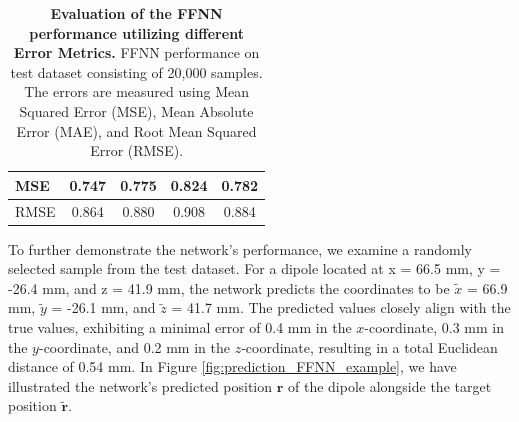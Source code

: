 \documentclass[a4paper, UKenglish, 11pt]{uiomaster}
\begin{document}
\begin{table}[!htb]
\begin{tabular}{l|cccc|}
\multicolumn{1}{|l|}{\cellcolor[HTML]{EFEFEF}MSE}  & \multicolumn{1}{c|}{0.747}                                                                                  & \multicolumn{1}{c|}{0.775}                                                                                   & \multicolumn{1}{c|}{0.824}                                                                                   & 0.782                                                                                                              \\ \hline
\multicolumn{1}{|l|}{\cellcolor[HTML]{EFEFEF}RMSE} & \multicolumn{1}{c|}{0.864}                                                                                  & \multicolumn{1}{c|}{0.880}                                                                                   & \multicolumn{1}{c|}{0.908}                                                                                   & 0.884                                                                                                              \\ \hline
\end{tabular}
\caption{\textbf{Evaluation of the FFNN performance utilizing different Error Metrics.} \newline
FFNN performance on test dataset consisting of 20,000 samples. The errors are measured using Mean Squared Error (MSE), Mean Absolute Error (MAE), and Root Mean Squared Error (RMSE).}
\label{table:error_simple_dipole}
\end{table}

To further demonstrate the network's performance, we examine a randomly selected sample from the test dataset. For a dipole located at x = 66.5 mm, y = -26.4 mm, and z = 41.9 mm, the network predicts the coordinates to be $\tilde{x}$ = 66.9 mm, $\tilde{y}$ = -26.1 mm, and $\tilde{z}$ = 41.7 mm. The predicted values closely align with the true values, exhibiting a minimal error of 0.4 mm in the $x$-coordinate, 0.3 mm in the $y$-coordinate, and 0.2 mm in the $z$-coordinate, resulting in a total Euclidean distance of 0.54 mm. In Figure \ref{fig:prediction_FFNN_example}, we have illustrated the network's predicted position $\mathbf{r}$ of the dipole alongside the target position $\mathbf{\tilde{r}}$.
\end{document}
